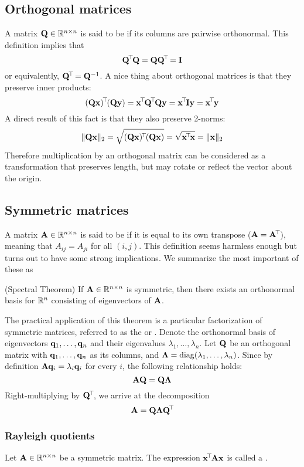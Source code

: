 \subsection{Orthogonal matrices}
A matrix $\mathbf{Q} \in \mathbb{R}^{n \times n}$ is said to be  if its columns are pairwise orthonormal.
This definition implies that
\[\mathbf{Q}^{\!\top\!} \mathbf{Q} = \mathbf{Q}\mathbf{Q}^{\!\top\!} = \mathbf{I}\]
or equivalently, $\mathbf{Q}^{\!\top\!} = \mathbf{Q}^{-1}$. A nice thing about orthogonal matrices is that they preserve inner products:
\[(\mat{Q}\x)\tran(\mat{Q}\y) = \x\tran \mat{Q}\tran \mat{Q}\y = \x\tran \I\y = \x\tran\y\]
A direct result of this fact is that they also preserve 2-norms:
\[\|\mathbf{Q}\mathbf{x}\|_2 = \sqrt{(\mathbf{Q}\mathbf{x})^{\!\top\!}(\mathbf{Q}\mathbf{x})} = \sqrt{\mathbf{x}^{\!\top\!}\mathbf{x}} = \|\mathbf{x}\|_2\]
Therefore multiplication by an orthogonal matrix can be considered as a transformation that preserves length, but may rotate or reflect the vector about the origin.

\subsection{Symmetric matrices}
A matrix $\mathbf{A} \in \mathbb{R}^{n \times n}$ is said to be  if it is equal to its own transpose ($\mathbf{A} = \mathbf{A}^{\!\top\!}$), meaning that $A_{ij} = A_{ji}$ for all $(i,j)$.
This definition seems harmless enough but turns out to have some strong implications.
We summarize the most important of these as
\begin{theorem}
(Spectral Theorem)
If $\mathbf{A} \in \mathbb{R}^{n \times n}$ is symmetric, then there exists an orthonormal basis for $\mathbb{R}^n$ consisting of eigenvectors of $\mathbf{A}$.
\end{theorem}
The practical application of this theorem is a particular factorization of symmetric matrices, referred to as the  or .
Denote the orthonormal basis of eigenvectors $\mathbf{q}_1, \dots, \mathbf{q}_n$ and their eigenvalues $\lambda_1, \dots, \lambda_n$.
Let $\mathbf{Q}$ be an orthogonal matrix with $\mathbf{q}_1, \dots, \mathbf{q}_n$ as its columns, and $\mathbf{\Lambda} = \operatorname*{diag}(\lambda_1, \dots, \lambda_n)$.
Since by definition $\mathbf{A}\mathbf{q}_i = \lambda_i\mathbf{q}_i$ for every $i$, the following relationship holds:
\[\mathbf{A}\mathbf{Q} = \mathbf{Q}\mathbf{\Lambda}\]
Right-multiplying by $\mathbf{Q}^{\!\top\!}$, we arrive at the decomposition
\[\mathbf{A} = \mathbf{Q}\mathbf{\Lambda}\mathbf{Q}^{\!\top\!}\]

\subsubsection{Rayleigh quotients}
Let $\mathbf{A} \in \mathbb{R}^{n \times n}$ be a symmetric matrix.
The expression $\mathbf{x}^{\!\top\!}\mathbf{A}\mathbf{x}$ is called a .

